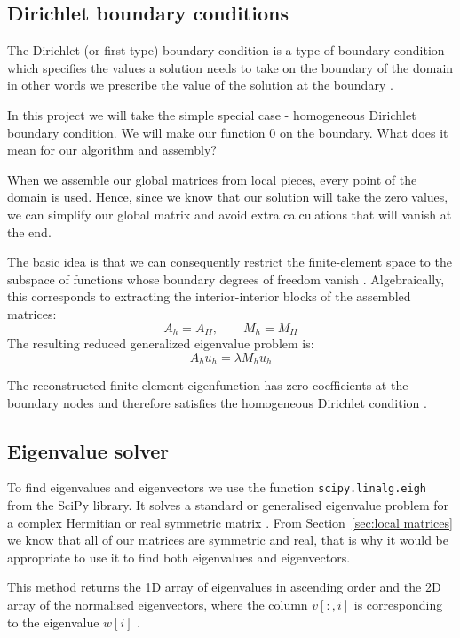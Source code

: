 \documentclass[acmsmall,screen]{MapleTrans}
\begin{document}
\subsection{Dirichlet boundary conditions}
The Dirichlet (or first-type) boundary condition is a type of boundary condition which specifies the values a solution needs to take on the boundary of the domain \cite{b0} in other words we prescribe the value of the solution at the boundary \cite{b10}.

In this project we will take the simple special case - homogeneous Dirichlet boundary condition. We will make our function $0$ on the boundary. What does it mean for our algorithm and assembly?

When we assemble our global matrices from local pieces, every point of the domain is used. Hence, since we know that our solution will take the zero values, we can simplify our global matrix and avoid extra calculations that will vanish at the end.

The basic idea is that we can consequently restrict the finite-element space to the subspace of functions whose boundary degrees of freedom vanish \cite{b22}. Algebraically, this corresponds to extracting the interior-interior blocks of the assembled matrices:
\begin{equation}
    A_h = A_{II},\qquad M_h=M_{II}
\end{equation}
The resulting reduced generalized eigenvalue problem is:
\begin{equation}
    A_h u_h = \lambda M_h u_h 
\end{equation}

The reconstructed finite-element eigenfunction has zero coefficients at the boundary nodes and therefore satisfies the homogeneous Dirichlet condition \cite{b22.1}.


\subsection{Eigenvalue solver}
To find eigenvalues and eigenvectors we use the function \texttt{scipy.linalg.eigh} from the SciPy library. It solves a standard or generalised eigenvalue problem for a complex Hermitian or real symmetric matrix \cite{b23}. From Section~\ref{sec:local matrices} we know that all of our matrices are symmetric and real, that is why it would be appropriate to use it to find both eigenvalues and eigenvectors.

This method returns the 1D array of eigenvalues in ascending order and the 2D array of the normalised eigenvectors, where the column $v[:, i]$ is corresponding to the eigenvalue $w[i]$ \cite{b23}.
\end{document}
